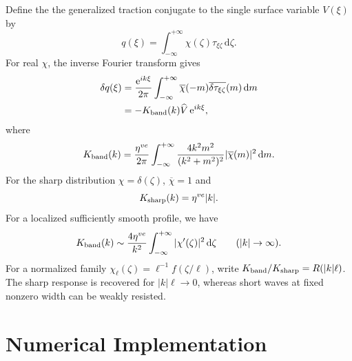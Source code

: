 \documentclass{article}
\begin{document}
Define the the generalized traction conjugate to the single surface variable
$V(\xi)$ by
\[
  q(\xi) = \int_{-\infty}^{+\infty}\chi(\zeta)\tau_{\xi\zeta}\,\mathrm d\zeta.
\]
For real $\chi$, the inverse Fourier transform gives
\begin{equation}
  \begin{aligned}
    \delta q(\xi)
    &=\frac{\mathrm e^{ik\xi}}{2\pi}
      \int_{-\infty}^{+\infty}\overline\chi(-m)
      \overline{\delta\tau_{\xi\zeta}}(m)\,\mathrm dm\\
    &=-K_{\rm band}(k)\widehat V\,\mathrm e^{ik\xi},
  \end{aligned}
\end{equation}
where
\begin{equation}\label{eq:fourier_band_stiffness}
  K_{\rm band}(k)=\frac{\eta^{ve}}{2\pi}
    \int_{-\infty}^{+\infty}
      \frac{4k^2m^2}{(k^2+m^2)^2}
      |\overline\chi(m)|^2\,\mathrm dm.
\end{equation}
For the sharp distribution $\chi=\delta(\zeta)$,
$\overline\chi=1$ and
\[
  K_{\rm sharp}(k)=\eta^{ve}|k|.
\]
For a localized sufficiently smooth profile, we have
\[
  K_{\rm band}(k)\sim
       \frac{4\eta^{ve}}{k^2}
          \int_{-\infty}^{+\infty}|\chi'(\zeta)|^2\,\mathrm d\zeta
       \qquad (|k|\rightarrow\infty).
\]
For a normalized family
$\chi_\ell(\zeta)=\ell^{-1}f(\zeta/\ell)$, write
$K_{\rm band}/K_{\rm sharp}=R(|k|\ell)$.
The sharp response is recovered for $|k|\ell\rightarrow0$, whereas
short waves at fixed nonzero width can be weakly resisted. 




\section{Numerical Implementation}\label{sect:implementation}
\end{document}
